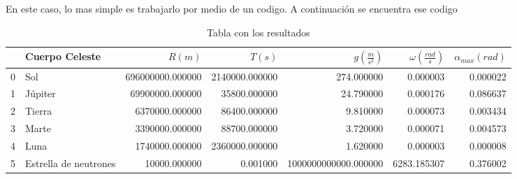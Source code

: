 \documentclass{report}
\begin{document}
\chapter{}

En este caso, lo mas simple es trabajarlo por medio de un codigo. A continuación se encuentra ese codigo



\begin{table}[htpb]
  \centering
  \caption{Tabla con los resultados}
  \label{tab:label}
  \begin{tabular}{llrrrrr}
    \hline
 & Cuerpo Celeste & $R (m)$ & $T (s)$ & $g (\frac{m}{s^2})$ & $\omega (\frac{rad}{s})$ & $\alpha_{max} (rad)$ \\
 \hline
    0 & Sol & 696000000.000000 & 2140000.000000 & 274.000000 & 0.000003 & 0.000022 \\
    1 & Júpiter & 69900000.000000 & 35800.000000 & 24.790000 & 0.000176 & 0.086637 \\
    2 & Tierra & 6370000.000000 & 86400.000000 & 9.810000 & 0.000073 & 0.003434 \\
    3 & Marte & 3390000.000000 & 88700.000000 & 3.720000 & 0.000071 & 0.004573 \\
    4 & Luna & 1740000.000000 & 2360000.000000 & 1.620000 & 0.000003 & 0.000008 \\
    5 & Estrella de neutrones & 10000.000000 & 0.001000 & 1000000000000.000000 & 6283.185307 & 0.376002 \\
    \hline
  \end{tabular}
\end{table}
\end{document}
